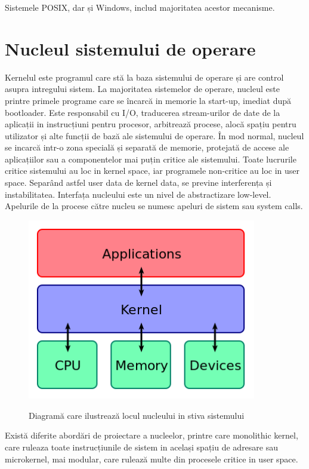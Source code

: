 \documentclass[a4paper, 12pt, twoside]{report}
\begin{document}
Sistemele POSIX, dar și Windows, includ majoritatea acestor mecanisme.

	\section{Nucleul sistemului de operare}
Kernelul este programul care stă la baza sistemului de operare și are control asupra intregului sistem. La majoritatea sistemelor de operare, nucleul este printre primele programe care se încarcă in memorie la start-up, imediat după bootloader. Este responsabil cu I/O, traducerea stream-urilor de date de la aplicații in instrucțiuni pentru procesor, arbitrează procese, alocă spațiu pentru utilizator și alte funcții de bază ale sistemului de operare. În mod normal, nucleul se incarcă intr-o zona specială și separată de memorie, protejată de accese ale aplicațiilor sau a componentelor mai puțin critice ale sistemului. Toate lucrurile critice sistemului au loc in kernel space, iar programele non-critice au loc in user space. Separând astfel user data de kernel data, se previne interferența și instabilitatea. Interfața nucleului este un nivel de abstractizare low-level. Apelurile de la procese către nucleu se numesc apeluri de sistem sau system calls.

\begin{figure}[h]
		\centering
			{\includegraphics[width=100mm]{kernel.png}}
		\caption{Diagramă care ilustrează locul nucleului in stiva sistemului}
\end{figure}

Există diferite abordări de proiectare a nucleelor, printre care monolithic kernel, care ruleaza toate instrucțiunile de sistem in același spațiu de adresare sau microkernel, mai modular, care rulează multe din procesele critice in user space.
\end{document}
